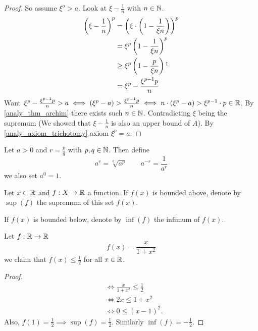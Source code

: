 \documentclass[10pt, a4paper]{article}
\begin{document}
\begin{theorem}
\begin{proof}
        So assume $\xi ^ o > a$.
        Look at $\xi - \frac{1}{n}$ with $n \in \mathbb{N}$.
        \begin{align*}
            \left(\xi - \frac{1}{n}\right) ^ p &= \left(\xi \cdot\left(1 - \frac{1}{\xi n}\right)\right) ^ p \\
            &= \xi ^ p \left(1 - \frac{1}{\xi n}\right) ^ p \\
            &\geq \xi ^ p \left(1 - \frac{p}{\xi n}\right)\footnotemark \\
            &= \xi ^ p - \frac{\xi ^ {p - 1}p}{n}
        \end{align*}
        Want $\xi ^ p - \frac{\xi ^ {p - 1}p}{n} > a \iff (\xi ^ p - a) > \frac{\xi ^ {p - 1}p}{n} \iff n \cdot (\xi ^ p - a) > \xi ^ {p - 1} \cdot p \in \mathbb{R}$.
        By \autoref{analy_thm_archim} there exists such $n \in \mathbb{N}$.
        Contradicting $\xi$ being the supremum (We showed that $\xi - \frac{1}{n}$ is also an upper bound of $A$).
        By \autoref{analy_axiom_trichotomy} axiom $\xi ^ p = a$.
        \end{proof}
\end{theorem}

\begin{definition}
    Let $a > 0$ and $r = \frac{p}{q}$ with $p, q \in \mathbb{N}$. Then define
    \[
    a ^ r = \sqrt[q]{a ^ p}\qquad a ^ {-r} = \frac{1}{a ^ r}
    \]
    we also set $a ^ 0 = 1$.
\end{definition}

\begin{definition}
    Let $x \subset \mathbb{R}$ and $f : X \rightarrow \mathbb{R}$ a function.
    If $f(x)$ is bounded above,
    denote by $\sup(f)$ the supremum of this set $f(x)$.

    If $f(x)$ is bounded below,
    denote by $\inf(f)$ the infimum of $f(x)$.
\end{definition}

\begin{example}
    Let $f : \mathbb{R} \rightarrow \mathbb{R}$
    \[
    f(x) = \frac{x}{1 + x ^ 2}
    \]
    we claim that $f(x) \leq \frac{1}{2}$ for all $x \in \mathbb{R}$.
    \begin{proof}
        \begin{align*}
            &\iff \frac{x}{1 + x ^ 2} \leq \frac{1}{2} \\
            &\iff 2x \leq 1 + x ^ 2 \\
            &\iff  0 \leq (x - 1) ^ 2.
        \end{align*}
        Also, $f(1) = \frac{1}{2} \implies \sup(f) = \frac{1}{2}$.
        Similarly $\inf(f) = -\frac{1}{2}$.
    \end{proof}
\end{example}
\end{document}
